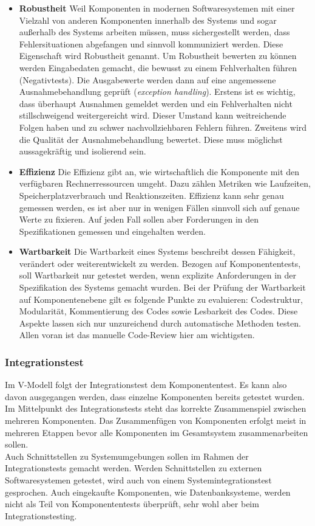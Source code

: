 \begin{itemize}

\item \textbf{Robustheit} Weil Komponenten in modernen Softwaresystemen mit einer Vielzahl von anderen Komponenten innerhalb des Systems und sogar außerhalb des Systems arbeiten müssen, muss sichergestellt werden, dass Fehlersituationen abgefangen und sinnvoll kommuniziert werden. Diese Eigenschaft wird Robustheit genannt. Um Robustheit bewerten zu können werden Eingabedaten gemacht, die bewusst zu einem Fehlverhalten führen (Negativtests). Die Ausgabewerte werden dann auf eine angemessene Ausnahmebehandlung geprüft (\textit{exception handling}). Erstens ist es wichtig, dass überhaupt Ausnahmen gemeldet werden und ein Fehlverhalten nicht stillschweigend weitergereicht wird. Dieser Umstand kann weitreichende Folgen haben und zu schwer nachvollziehbaren Fehlern führen. Zweitens wird die Qualität der Ausnahmebehandlung bewertet. Diese muss möglichst aussagekräftig und isolierend sein.

\item \textbf{Effizienz} Die Effizienz gibt an, wie wirtschaftlich die Komponente mit den verfügbaren Rechnerressourcen umgeht. Dazu zählen Metriken wie Laufzeiten, Speicherplatzverbrauch und Reaktionszeiten. Effizienz kann sehr genau gemessen werden, es ist aber nur in wenigen Fällen sinnvoll sich auf genaue Werte zu fixieren. Auf jeden Fall sollen aber Forderungen in den Spezifikationen gemessen und eingehalten werden.

\item \textbf{Wartbarkeit} Die Wartbarkeit eines Systems beschreibt dessen Fähigkeit, verändert oder weiterentwickelt zu werden. Bezogen auf Komponententests, soll Wartbarkeit nur getestet werden, wenn explizite Anforderungen in der Spezifikation des Systems gemacht wurden. Bei der Prüfung der Wartbarkeit auf Komponentenebene gilt es folgende Punkte zu evaluieren: Codestruktur, Modularität, Kommentierung des Codes sowie Lesbarkeit des Codes. Diese Aspekte lassen sich nur unzureichend durch automatische Methoden testen. Allen voran ist das manuelle Code-Review hier am wichtigsten.

\end{itemize}

\subsubsection{Integrationstest}
Im V-Modell folgt der Integrationstest dem Komponententest. Es kann also davon ausgegangen werden, dass einzelne Komponenten bereits getestet wurden. Im Mittelpunkt des Integrationstests steht das korrekte Zusammenspiel zwischen mehreren Komponenten. Das Zusammenfügen von Komponenten erfolgt meist in mehreren Etappen bevor alle Komponenten im Gesamtsystem zusammenarbeiten sollen.\\
Auch Schnittstellen zu Systemumgebungen sollen im Rahmen der Integrationstests gemacht werden. Werden Schnittstellen zu externen Softwaresystemen getestet, wird auch von einem Systemintegrationstest gesprochen. Auch eingekaufte Komponenten, wie Datenbanksysteme, werden nicht als Teil von Komponententests überprüft, sehr wohl aber beim Integrationstesting.

